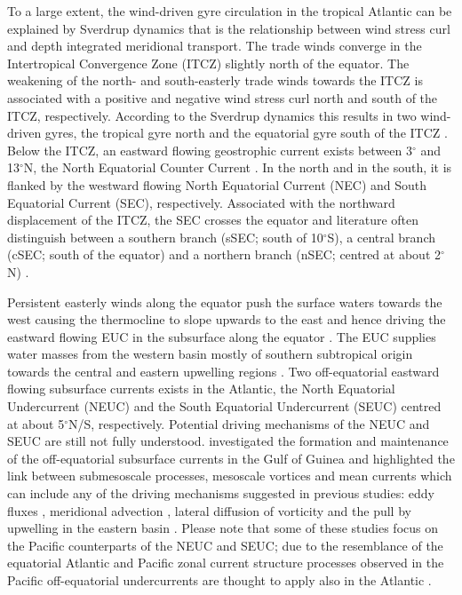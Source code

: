\documentclass[os, manuscript]{copernicus}
\begin{document}
To a large extent, the wind-driven gyre circulation in the tropical Atlantic can be explained by Sverdrup dynamics that is the relationship between wind stress curl and depth integrated meridional transport. The trade winds converge in the Intertropical Convergence Zone (ITCZ) slightly north of the equator. The weakening of the north- and south-easterly trade winds towards the ITCZ is associated with a positive and negative wind stress curl north and south of the ITCZ, respectively. According to the Sverdrup dynamics this results in two wind-driven gyres, the tropical gyre north and the equatorial gyre south of the ITCZ \cite[e.g.,][]{Fratantoni2000}. Below the ITCZ, an eastward flowing geostrophic current exists between 3$^{\circ}$ and 13$^{\circ}$N, the North Equatorial Counter Current \citep[Fig. \ref{fig_mean_curl};][]{Urbano2006}. In the north and in the south, it is flanked by the westward flowing North Equatorial Current (NEC) and South Equatorial Current (SEC), respectively. Associated with the northward displacement of the ITCZ, the SEC crosses the equator and literature often distinguish between a southern branch (sSEC; south of 10$^{\circ}$S), a central branch (cSEC; south of the equator) and a northern branch (nSEC; centred at about 2$^{\circ}$N) \cite[e.g.][]{Peterson1991,Schott2004}. 

Persistent easterly winds along the equator push the surface waters towards the west causing the thermocline to slope upwards to the east and hence driving the eastward flowing EUC in the subsurface along the equator \citep{Pedlosky1987,Wacongne1989}. The EUC supplies water masses from the western basin mostly of southern subtropical origin towards the central and eastern upwelling regions \citep[e.g.][]{Bourles2002,Schott2004,Brandt2006}. Two off-equatorial eastward flowing subsurface currents exists in the Atlantic, the North Equatorial Undercurrent (NEUC) and the South Equatorial Undercurrent (SEUC) centred at about 5$^{\circ}$N/S, respectively. Potential driving mechanisms of the NEUC and SEUC are still not fully understood. \cite{Assene2020} investigated the formation and maintenance of the off-equatorial subsurface currents in the Gulf of Guinea and highlighted the link between submesoscale processes, mesoscale vortices and mean currents which can include any of the driving mechanisms suggested in previous studies: eddy fluxes \citep{Jochum2004b}, meridional advection \citep{Wang2005,Johnson1997,Marin2000,Hua2003,Marin2003,Ishida2005}, lateral diffusion of vorticity \citep{McPhaden1984} and the pull by upwelling in the eastern basin \citep{McCreary2002a,Furue2007,Furue2009}. Please note that some of these studies focus on the Pacific counterparts of the NEUC and SEUC; due to the resemblance of the equatorial Atlantic and Pacific zonal current structure \citep[e.g.][]{Schott2004} processes observed in the Pacific off-equatorial undercurrents are thought to apply also in the Atlantic \citep{Assene2020}.
\end{document}
